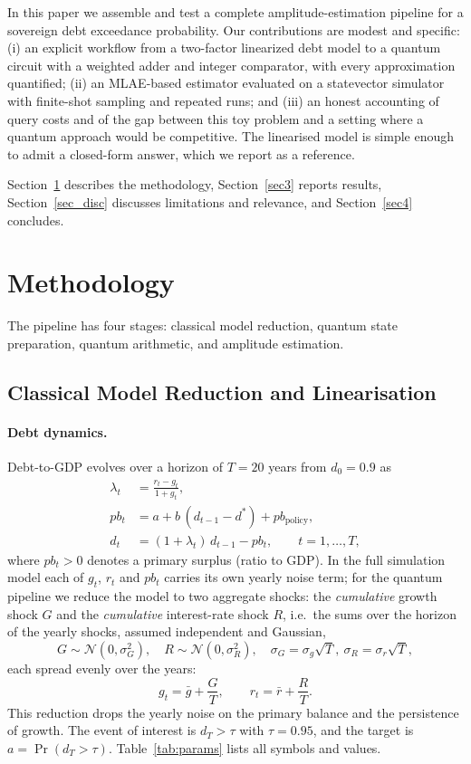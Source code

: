 \documentclass[pdflatex,sn-mathphys-num]{sn-jnl}%
\theoremstyle{thmstyleone}%
\theoremstyle{thmstyletwo}%
\theoremstyle{thmstylethree}%
\begin{document}
In this paper we assemble and test a complete amplitude-estimation pipeline for a sovereign debt exceedance probability. Our contributions are modest and specific: (i) an explicit workflow from a two-factor linearized debt model to a quantum circuit with a weighted adder and integer comparator, with every approximation quantified; (ii) an MLAE-based estimator evaluated on a statevector simulator with finite-shot sampling and repeated runs; and (iii) an honest accounting of query costs and of the gap between this toy problem and a setting where a quantum approach would be competitive. The linearised model is simple enough to admit a closed-form answer, which we report as a reference.

Section~\ref{sec2} describes the methodology, Section~\ref{sec3} reports results, Section~\ref{sec_disc} discusses limitations and relevance, and Section~\ref{sec4} concludes.

\section{Methodology}\label{sec2}

The pipeline has four stages: classical model reduction, quantum state preparation, quantum arithmetic, and amplitude estimation.

\subsection{Classical Model Reduction and Linearisation}

\paragraph{Debt dynamics.} Debt-to-GDP evolves over a horizon of $T=20$ years from $d_0=0.9$ as
\begin{align}
\lambda_t &= \frac{r_t-g_t}{1+g_t}, \label{eq:lambda}\\
pb_t &= a + b\,(d_{t-1}-d^{*}) + pb_{\mathrm{policy}}, \label{eq:pb}\\
d_t &= (1+\lambda_t)\,d_{t-1} - pb_t, \qquad t=1,\dots,T, \label{eq:debt}
\end{align}
where $pb_t>0$ denotes a primary surplus (ratio to GDP). In the full simulation model each of $g_t$, $r_t$ and $pb_t$ carries its own yearly noise term; for the quantum pipeline we reduce the model to two aggregate shocks: the \emph{cumulative} growth shock $G$ and the \emph{cumulative} interest-rate shock $R$, i.e.\ the sums over the horizon of the yearly shocks, assumed independent and Gaussian,
\begin{equation}
G\sim\mathcal N(0,\sigma_G^2),\quad R\sim\mathcal N(0,\sigma_R^2),\quad \sigma_G=\sigma_g\sqrt T,\ \sigma_R=\sigma_r\sqrt T,
\end{equation}
each spread evenly over the years:
\begin{equation}
g_t = \bar g + \frac{G}{T},\qquad r_t = \bar r + \frac{R}{T}. \label{eq:gr}
\end{equation}
This reduction drops the yearly noise on the primary balance and the persistence of growth. The event of interest is $d_T>\tau$ with $\tau=0.95$, and the target is $a=\Pr(d_T>\tau)$. Table~\ref{tab:params} lists all symbols and values.
\end{document}
